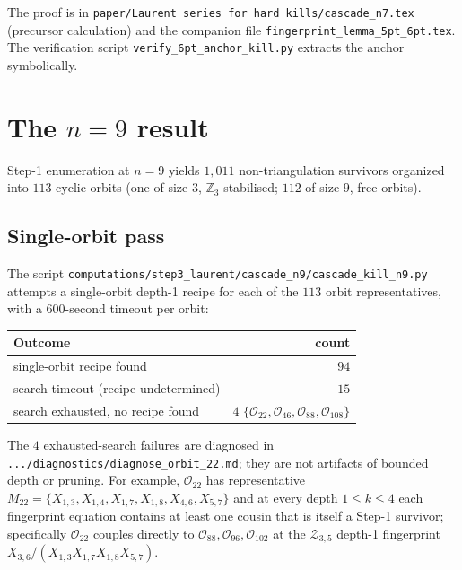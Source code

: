 \documentclass[11pt]{article}
\theoremstyle{definition}
\begin{document}
The proof is in
\verb|paper/Laurent series for hard kills/cascade_n7.tex| (precursor
calculation) and the companion file
\verb|fingerprint_lemma_5pt_6pt.tex|. The verification script
\verb|verify_6pt_anchor_kill.py| extracts the anchor symbolically.

\section{The $n=9$ result}\label{sec:n9}

Step-1 enumeration at $n=9$ yields $1{,}011$ non-triangulation
survivors organized into $113$ cyclic orbits (one of size $3$,
$\mathbb Z_3$-stabilised; $112$ of size $9$, free orbits).

\subsection{Single-orbit pass}\label{subsec:single}

The script
\verb|computations/step3_laurent/cascade_n9/cascade_kill_n9.py|
attempts a single-orbit depth-1 recipe for each of the $113$ orbit
representatives, with a $600$-second timeout per orbit:

\begin{center}
\begin{tabular}{lr}
\toprule
Outcome & count \\
\midrule
single-orbit recipe found & $94$ \\
search timeout (recipe undetermined) & $15$ \\
search exhausted, no recipe found & $4$\quad
$\{\mathcal O_{22}, \mathcal O_{46}, \mathcal O_{88}, \mathcal O_{108}\}$ \\
\bottomrule
\end{tabular}
\end{center}

The $4$ exhausted-search failures are diagnosed in
\verb|.../diagnostics/diagnose_orbit_22.md|; they are not artifacts
of bounded depth or pruning. For example, $\mathcal O_{22}$ has
representative $M_{22}=\{X_{1,3},X_{1,4},X_{1,7},X_{1,8},X_{4,6},
X_{5,7}\}$ and at every depth $1\le k\le 4$ each fingerprint
equation contains at least one cousin that is itself a Step-1
survivor; specifically $\mathcal O_{22}$ couples directly to
$\mathcal O_{88},\mathcal O_{96},\mathcal O_{102}$ at the
$\mathcal Z_{3,5}$ depth-1 fingerprint $X_{3,6}/(X_{1,3}X_{1,7}
X_{1,8}X_{5,7})$.
\end{document}
